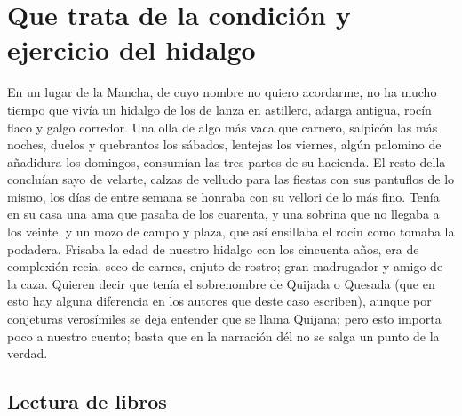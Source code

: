 
\pagestyle{fancy}
\renewcommand{\thepage}{\arabic{page}}
\setcounter{page}{1}
\thispagestyle{empty}
\chapter[Inicio]{Que trata de la condición y ejercicio del hidalgo}


En un lugar de la Mancha, de cuyo nombre no quiero acordarme, no ha
mucho tiempo que vivía un hidalgo de los de lanza en astillero, adarga
antigua, rocín flaco y galgo corredor. Una olla de algo más vaca que
carnero, salpicón las más noches, duelos y quebrantos los sábados,
lentejas los viernes, algún palomino de añadidura los domingos,
consumían las tres partes de su hacienda. El resto della concluían
sayo de velarte, calzas de velludo para las fiestas con sus pantuflos
de lo mismo, los días de entre semana se honraba con su vellori de lo
más fino. Tenía en su casa una ama que pasaba de los cuarenta, y una
sobrina que no llegaba a los veinte, y un mozo de campo y plaza, que
así ensillaba el rocín como tomaba la podadera. Frisaba la edad de
nuestro hidalgo con los cincuenta años, era de complexión recia, seco
de carnes, enjuto de rostro; gran madrugador y amigo de la caza.
Quieren decir que tenía el sobrenombre de Quijada o Quesada (que en
esto hay alguna diferencia en los autores que deste caso escriben),
aunque por conjeturas verosímiles se deja entender que se llama
Quijana; pero esto importa poco a nuestro cuento; basta que en la
narración dél no se salga un punto de la verdad.

\section{Lectura de libros}

